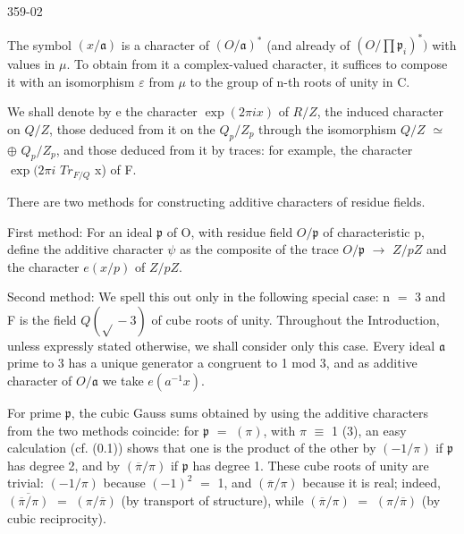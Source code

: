 \documentclass[10pt,a4paper]{article}
\begin{document}
\clearpage
{}
\label{d035-physical-002}
\par 359-02\par
\par The symbol $(x/\mathfrak{a})$ is a character of $(O/\mathfrak{a})^*$ (and already of $(O/\prod{}\mathfrak{p}_i)^*)$ with values in $\mu{}$. To obtain from it a complex-valued character, it suffices to compose it with an isomorphism $\varepsilon{}$ from $\mu{}$ to the group of n-th roots of unity in C.\par
\par We shall denote by e the character $\exp(2\pi{}ix)$ of $R/Z$, the induced character on $Q/Z$, those deduced from it on the $Q_p/Z_p$ through the isomorphism $Q/Z$ $\simeq{}$ $\oplus{}$ $Q_p/Z_p$, and those deduced from it by traces: for example, the character $\exp(2\pi{}i$ $Tr_{F/Q}$ x) of F.\par
\par There are two methods for constructing additive characters of residue fields.\par
\par First method: For an ideal $\mathfrak{p}$ of O, with residue field $O/\mathfrak{p}$ of characteristic p, define the additive character $\psi{}$ as the composite of the trace $O/\mathfrak{p}$ $\to{}$ $Z/pZ$ and the character $e(x/p)$ of $Z/pZ$.\par
\par Second method: We spell this out only in the following special case: n $=$ 3 and F is the field $Q(\sqrt{}-3)$ of cube roots of unity. Throughout the Introduction, unless expressly stated otherwise, we shall consider only this case. Every ideal $\mathfrak{a}$ prime to 3 has a unique generator a congruent to 1 mod 3, and as additive character of $O/\mathfrak{a}$ we take $e(a^{-1}x)$.\par
\par For prime $\mathfrak{p}$, the cubic Gauss sums obtained by using the additive characters from the two methods coincide: for $\mathfrak{p}$ $=$ $(\pi{})$, with $\pi{}$ $\equiv{}$ 1 (3), an easy calculation (cf. (0.1)) shows that one is the product of the other by $(-1/\pi{})$ if $\mathfrak{p}$ has degree 2, and by $(\overline{\pi{}}/\pi{})$ if $\mathfrak{p}$ has degree 1. These cube roots of unity are trivial: $(-1/\pi{})$ because $(-1)^2$ $=$ 1, and $(\overline{\pi{}}/\pi{})$ because it is real; indeed, $\overline{(\overline{\pi{}}/\pi{})}$ $=$ $(\pi{}/\overline{\pi{}})$ (by transport of structure), while $(\overline{\pi{}}/\pi{})$ $=$ $(\pi{}/\overline{\pi{}})$ (by cubic reciprocity).\par
\end{document}
